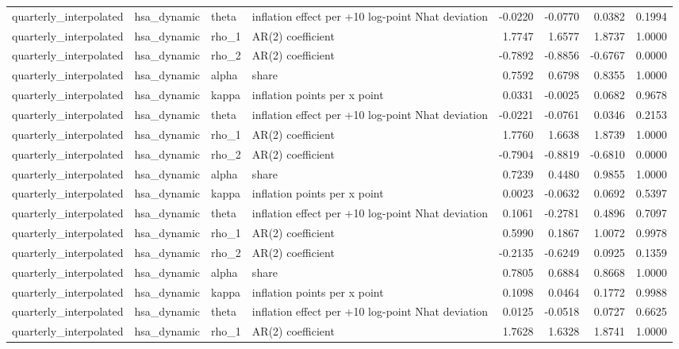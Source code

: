 \begin{tabular}{llllrrrr}
quarterly\_interpolated & hsa\_dynamic & theta & inflation effect per +10 log-point Nhat deviation & -0.0220 & -0.0770 & 0.0382 & 0.1994 \\
quarterly\_interpolated & hsa\_dynamic & rho\_1 & AR(2) coefficient & 1.7747 & 1.6577 & 1.8737 & 1.0000 \\
quarterly\_interpolated & hsa\_dynamic & rho\_2 & AR(2) coefficient & -0.7892 & -0.8856 & -0.6767 & 0.0000 \\
quarterly\_interpolated & hsa\_dynamic & alpha & share & 0.7592 & 0.6798 & 0.8355 & 1.0000 \\
quarterly\_interpolated & hsa\_dynamic & kappa & inflation points per x point & 0.0331 & -0.0025 & 0.0682 & 0.9678 \\
quarterly\_interpolated & hsa\_dynamic & theta & inflation effect per +10 log-point Nhat deviation & -0.0221 & -0.0761 & 0.0346 & 0.2153 \\
quarterly\_interpolated & hsa\_dynamic & rho\_1 & AR(2) coefficient & 1.7760 & 1.6638 & 1.8739 & 1.0000 \\
quarterly\_interpolated & hsa\_dynamic & rho\_2 & AR(2) coefficient & -0.7904 & -0.8819 & -0.6810 & 0.0000 \\
quarterly\_interpolated & hsa\_dynamic & alpha & share & 0.7239 & 0.4480 & 0.9855 & 1.0000 \\
quarterly\_interpolated & hsa\_dynamic & kappa & inflation points per x point & 0.0023 & -0.0632 & 0.0692 & 0.5397 \\
quarterly\_interpolated & hsa\_dynamic & theta & inflation effect per +10 log-point Nhat deviation & 0.1061 & -0.2781 & 0.4896 & 0.7097 \\
quarterly\_interpolated & hsa\_dynamic & rho\_1 & AR(2) coefficient & 0.5990 & 0.1867 & 1.0072 & 0.9978 \\
quarterly\_interpolated & hsa\_dynamic & rho\_2 & AR(2) coefficient & -0.2135 & -0.6249 & 0.0925 & 0.1359 \\
quarterly\_interpolated & hsa\_dynamic & alpha & share & 0.7805 & 0.6884 & 0.8668 & 1.0000 \\
quarterly\_interpolated & hsa\_dynamic & kappa & inflation points per x point & 0.1098 & 0.0464 & 0.1772 & 0.9988 \\
quarterly\_interpolated & hsa\_dynamic & theta & inflation effect per +10 log-point Nhat deviation & 0.0125 & -0.0518 & 0.0727 & 0.6625 \\
quarterly\_interpolated & hsa\_dynamic & rho\_1 & AR(2) coefficient & 1.7628 & 1.6328 & 1.8741 & 1.0000 \\

\end{tabular}
